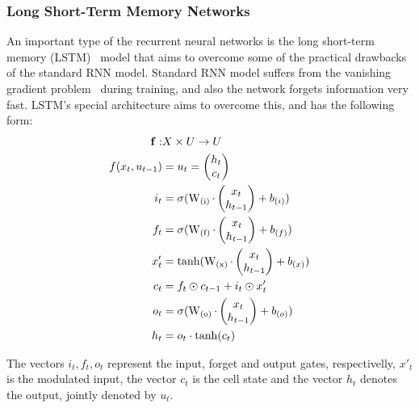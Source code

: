 \documentclass[10pt,twocolumn]{article}
\begin{document}
\subsubsection{Long Short-Term Memory Networks}
\label{sec:lstm}
An important type of the recurrent neural networks is the long short-term memory (LSTM)~\cite{hochreiter1997long} model that aims to overcome some of the practical drawbacks of the standard RNN model. Standard RNN model suffers from the vanishing gradient problem~\cite{bengio1994learning} during training, and also the network forgets information very fast. LSTM's special architecture aims to overcome this, and has the following form:
\begin{align*}
\bf{f}: & X \times U \rightarrow U \\ %
f(x_t, u_{t-1}) & = u_t = \begin{pmatrix}
h_t \\
c_t
\end{pmatrix} \\
i_t &= \sigma(\operatorname{W_{(i)}} \cdot \begin{pmatrix}
x_t \\
h_{t-1}
\end{pmatrix} + b_{(i)}) \\
f_t &= \sigma(\operatorname{W_{(f)}} \cdot \begin{pmatrix}
x_t \\
h_{t-1}
\end{pmatrix} + b_{(f)}) \\
x'_t &= \operatorname{tanh}(\operatorname{W_{(x)}} \cdot \begin{pmatrix}
x_t \\
h_{t-1}
\end{pmatrix} + b_{(x)}) \\
c_t &= f_t \odot c_{t-1} + i_t \odot x'_t \\
o_t &= \sigma(\operatorname{W_{(o)}} \cdot \begin{pmatrix}
x_t \\
h_{t-1}
\end{pmatrix} + b_{(o)}) \\
h_t &= o_t \cdot \operatorname{tanh}(c_t)
\end{align*}

The vectors $i_t, f_t, o_t$ represent the input, forget and output gates, respectivelly, $x'_t$ is the modulated input, the vector $c_t$ is the cell state and the vector $h_t$ denotes the output, jointly denoted by $u_t$.
\end{document}
